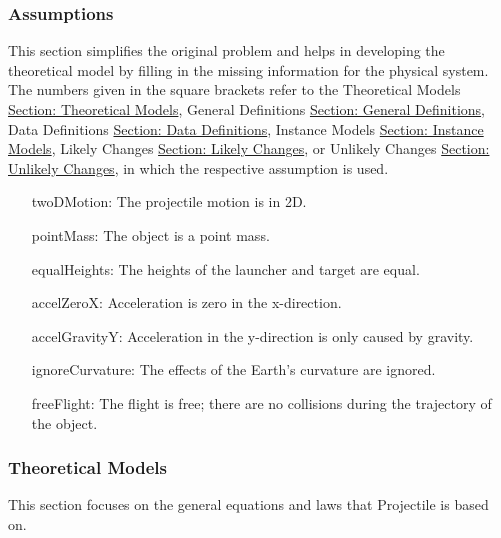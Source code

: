 \documentclass[12pt]{article}
\begin{document}
\subsubsection{Assumptions}
\label{Sec:Assumps}
This section simplifies the original problem and helps in developing the theoretical model by filling in the missing information for the physical system. The numbers given in the square brackets refer to the Theoretical Models \hyperref[Sec:TMs]{Section: Theoretical Models}, General Definitions \hyperref[Sec:GDs]{Section: General Definitions}, Data Definitions \hyperref[Sec:DDs]{Section: Data Definitions}, Instance Models \hyperref[Sec:IMs]{Section: Instance Models}, Likely Changes \hyperref[Sec:LCs]{Section: Likely Changes}, or Unlikely Changes \hyperref[Sec:UCs]{Section: Unlikely Changes}, in which the respective assumption is used.
\begin{itemize}
\item[twoDMotion:\phantomsection\label{twoDMotion}]The projectile motion is in 2D.
\item[pointMass:\phantomsection\label{pointMass}]The object is a point mass.
\item[equalHeights:\phantomsection\label{equalHeights}]The heights of the launcher and target are equal.
\item[accelZeroX:\phantomsection\label{accelZeroX}]Acceleration is zero in the x-direction.
\item[accelGravityY:\phantomsection\label{accelGravityY}]Acceleration in the y-direction is only caused by gravity.
\item[ignoreCurvature:\phantomsection\label{ignoreCurvature}]The effects of the Earth's curvature are ignored.
\item[freeFlight:\phantomsection\label{freeFlight}]The flight is free; there are no collisions during the trajectory of the object.
\end{itemize}
\subsubsection{Theoretical Models}
\label{Sec:TMs}
This section focuses on the general equations and laws that Projectile is based on.
\par~
\end{document}
